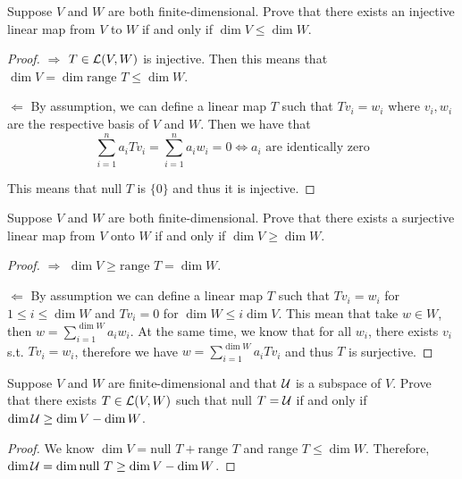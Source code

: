 \documentclass{extarticle}
\begin{document}
\begin{problem}{16}
    Suppose \(V\) and \(W\) are both finite-dimensional. Prove that there exists an injective 
    linear map from \(V\) to \(W\) if and only if \(\dim V \leq \dim W\).
\end{problem}

\begin{proof}
\(\Rightarrow\) \(T \in \mathcal{L}(V, W)\) is injective. Then this means that \(\dim V = \dim \text{range } T
\leq \dim W\). 

\(\Leftarrow\) By assumption, we can define a linear map \(T\) such that 
\(T v_i = w_i\) where \(v_i, w_i\) are the respective basis of \(V\) and \(W\). 
Then we have that 
\[\sum_{i=1}^{n} a_i T v_i = \sum_{i=1}^{n} a_i w_i = 0 \Leftrightarrow a_i \text{ are identically zero} \]

This means that null \(T\) is \(\{0\}\) and thus it is injective. 
\end{proof}


\begin{problem}{17}
    Suppose \(V\) and \(W\) are both finite-dimensional. Prove that there exists 
    a surjective linear map from \(V\) onto \(W\) if and only if \(\dim V \geq \dim W\).
\end{problem}

\begin{proof}
\(\Rightarrow\) \(\dim V \geq \text{range } T = \dim W\). 

\(\Leftarrow\) By assumption we can define a linear map \(T\) such that 
\(T v_i = w_i\) for \( 1 \leq i \leq \dim W\) and \(T v_i = 0\) for \(\dim W \leq i \dim V\). 
This mean that take \(w \in W\), then \(w = \sum_{i=1}^{\dim W}a_i w_i\). At the 
same time, we know that for all \(w_i\), there exists \(v_i\) s.t. \(T v_i = w_i\), 
therefore we have \(w = \sum_{i=1}^{\dim W} a_i Tv_i\) and thus \(T\) is surjective.   
\end{proof}


\begin{problem}{18}
    Suppose \(V\) and \(W\) are finite-dimensional and that \(\mathcal{U}\) is a 
    subspace of \(V\). Prove that there exists \(T \in \mathcal{L}(V, W)\) such 
    that null \(T = \mathcal{U}\) if and only if \(\dim \mathcal{U} \geq \dim V - \dim W\). 
\end{problem}

\begin{proof}
We know \(\dim V = \text{null } T + \text{range } T\) and range \(T \leq \dim W\).
Therefore, \(\dim \mathcal{U} = \dim \text{null } T \geq \dim V - \dim W\).  

\end{proof}
\end{document}
